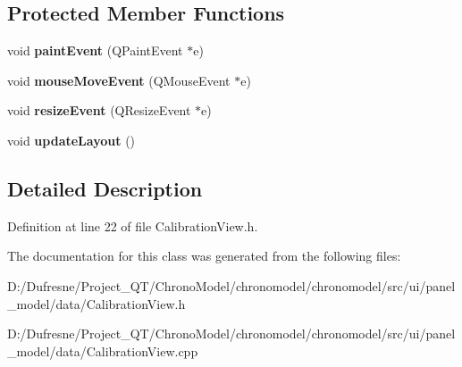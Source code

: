 \subsection*{Protected Member Functions}
\begin{DoxyCompactItemize}
\item 
\hypertarget{class_calibration_view_a20740d446504bb9237f80141de65b34d}{void {\bfseries paint\-Event} (Q\-Paint\-Event $\ast$e)}\label{class_calibration_view_a20740d446504bb9237f80141de65b34d}

\item 
\hypertarget{class_calibration_view_a812a9aeb643afa5da6207cdd7a01d875}{void {\bfseries mouse\-Move\-Event} (Q\-Mouse\-Event $\ast$e)}\label{class_calibration_view_a812a9aeb643afa5da6207cdd7a01d875}

\item 
\hypertarget{class_calibration_view_a0fc064c59ba383261755f3a52a2e84d3}{void {\bfseries resize\-Event} (Q\-Resize\-Event $\ast$e)}\label{class_calibration_view_a0fc064c59ba383261755f3a52a2e84d3}

\item 
\hypertarget{class_calibration_view_afe7a30eab5418d5d2a2e4f428a355d00}{void {\bfseries update\-Layout} ()}\label{class_calibration_view_afe7a30eab5418d5d2a2e4f428a355d00}

\end{DoxyCompactItemize}


\subsection{Detailed Description}


Definition at line 22 of file Calibration\-View.\-h.



The documentation for this class was generated from the following files\-:\begin{DoxyCompactItemize}
\item 
D\-:/\-Dufresne/\-Project\-\_\-\-Q\-T/\-Chrono\-Model/chronomodel/chronomodel/src/ui/panel\-\_\-model/data/Calibration\-View.\-h\item 
D\-:/\-Dufresne/\-Project\-\_\-\-Q\-T/\-Chrono\-Model/chronomodel/chronomodel/src/ui/panel\-\_\-model/data/Calibration\-View.\-cpp\end{DoxyCompactItemize}
